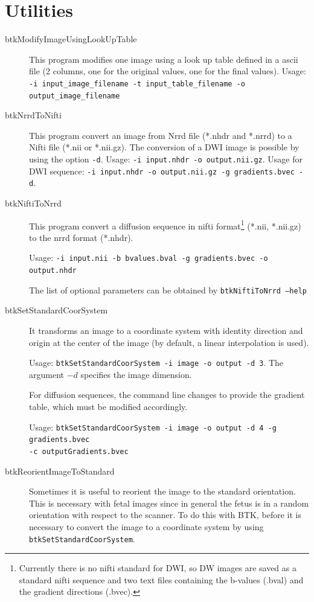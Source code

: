 \section{Utilities}


\begin{description}

\item[btkModifyImageUsingLookUpTable] This program modifies one image using a
look up table defined in a ascii file (2 columns, one for the original values,
one for the final values). Usage: \texttt{-i input\_image\_filename -t
input\_table\_filename -o output\_image\_filename}
  

\item[btkNrrdToNifti] This program convert an image from Nrrd file (*.nhdr and *.nrrd) to a Nifti file (*.nii or *.nii.gz). The conversion of a DWI image is possible by using the option \texttt{-d}. Usage: \texttt{-i input.nhdr -o output.nii.gz}. Usage for DWI sequence: \texttt{-i input.nhdr -o output.nii.gz -g gradients.bvec -d}.

\item[btkNiftiToNrrd] This program convert a diffusion sequence in nifti
format\footnote{Currently there is no nifti standard for DWI, so DW images are
saved as a standard nifti sequence and two text files containing the b-values
(.bval) and the gradient directions (.bvec).} (*.nii, *.nii.gz) to the nrrd
format (*.nhdr). 

Usage: \texttt{-i input.nii -b bvalues.bval -g gradients.bvec -o output.nhdr
}

The list of optional parameters can be obtained by \texttt{btkNiftiToNrrd
--help}

\item[btkSetStandardCoorSystem] It transforms an image to a coordinate
system with identity direction and origin at the center of the image
(by default, a linear interpolation is used).

Usage: \texttt{btkSetStandardCoorSystem -i image -o output -d 3}. The argument
$-d$ specifies the image dimension. 

For diffusion sequences, the command line changes to provide the gradient
table, which must be modified accordingly.

Usage: \texttt{btkSetStandardCoorSystem -i image -o output -d 4 -g
gradients.bvec}\\
\texttt{-c outputGradients.bvec}
  
  \item[btkReorientImageToStandard] Sometimes it is useful
to reorient the image to the standard orientation. This is necessary with fetal
images since in general the fetus is in a random orientation with respect to the
scanner. To do this with BTK, before it is necessary to convert the image
to a coordinate system by using \texttt{btkSetStandardCoorSystem}.


\end{description}
